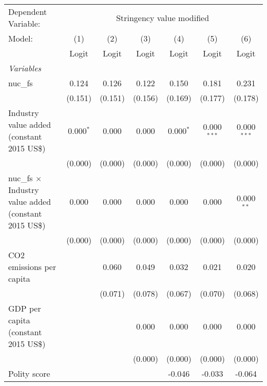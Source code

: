 
\begingroup
\centering
\begin{tabular}{lcccccc}
   \toprule
   Dependent Variable: & \multicolumn{6}{c}{Stringency value modified}\\
   Model:                                                        & (1)         & (2)     & (3)     & (4)         & (5)           & (6)\\  
                                                                 &  Logit      & Logit   & Logit   & Logit       & Logit         & Logit\\  
   \midrule
   \emph{Variables}\\
   nuc\_fs                                                       & 0.124       & 0.126   & 0.122   & 0.150       & 0.181         & 0.231\\   
                                                                 & (0.151)     & (0.151) & (0.156) & (0.169)     & (0.177)       & (0.178)\\   
   Industry value added (constant 2015 US\$)                     & 0.000$^{*}$ & 0.000   & 0.000   & 0.000$^{*}$ & 0.000$^{***}$ & 0.000$^{***}$\\   
                                                                 & (0.000)     & (0.000) & (0.000) & (0.000)     & (0.000)       & (0.000)\\   
   nuc\_fs $\times$ Industry value added (constant 2015 US\$)    & 0.000       & 0.000   & 0.000   & 0.000       & 0.000         & 0.000$^{**}$\\   
                                                                 & (0.000)     & (0.000) & (0.000) & (0.000)     & (0.000)       & (0.000)\\   
   CO2 emissions per capita                                      &             & 0.060   & 0.049   & 0.032       & 0.021         & 0.020\\   
                                                                 &             & (0.071) & (0.078) & (0.067)     & (0.070)       & (0.068)\\   
   GDP per capita (constant 2015 US\$)                           &             &         & 0.000   & 0.000       & 0.000         & 0.000\\   
                                                                 &             &         & (0.000) & (0.000)     & (0.000)       & (0.000)\\   
   Polity score                                                  &             &         &         & -0.046      & -0.033        & -0.064\\   

\end{tabular}
